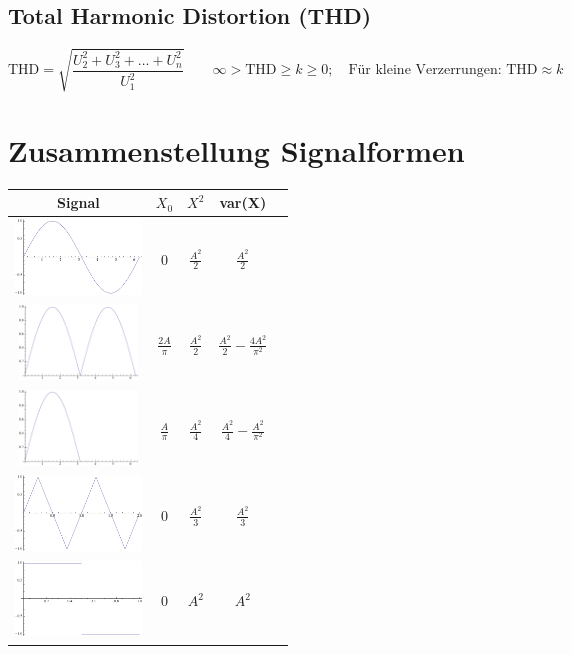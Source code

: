 \subsection{Total Harmonic Distortion (THD) }
$$\text{THD} = \sqrt{ \frac {U_2^2+ U_3^2 + \ldots + U_n^2} {U_1^2} } \qquad
\infty > \text{THD} \geq k \geq 0; \quad \text{Für kleine Verzerrungen: THD}
\approx k $$


\section{Zusammenstellung Signalformen}
\begin{table}[htdp]
\begin{center}
\begin{tabular}{|c|c|c|c|c|}
\hline
\textbf{Signal} & \textbf{$   X_0   $} & \textbf{$X^2$} & \textbf{var(X)} \\
\hline
\includegraphics[height=2cm]{./bilder/Sinus.pdf} & $0$ & $\frac{A^2}{2}$ &
$\frac{A^2}{2}$ \\
\hline
\includegraphics[height=2cm]{./bilder/absSinus.pdf}  & $\frac{2A}{\pi}$ &
$\frac{A^2}{2}$ & $\frac{A^2}{2}-\frac{4A^2}{\pi^2}$\\
\hline
\includegraphics[height=2cm]{./bilder/halbSinus.pdf} & $\frac{A}{\pi}$ &
$\frac{A^2}{4}$ & $\frac{A^2}{4}-\frac{A^2}{\pi^2}$\\
\hline
\includegraphics[height=2cm]{./bilder/triangular.pdf} & $0$ & $\frac{A^2}{3}$ &
$\frac{A^2}{3}$ \\
\hline
\includegraphics[height=2cm]{./bilder/square.pdf} & $0$ & $A^2$ & $A^2$ \\

\end{tabular}
\end{center}
\end{table}
